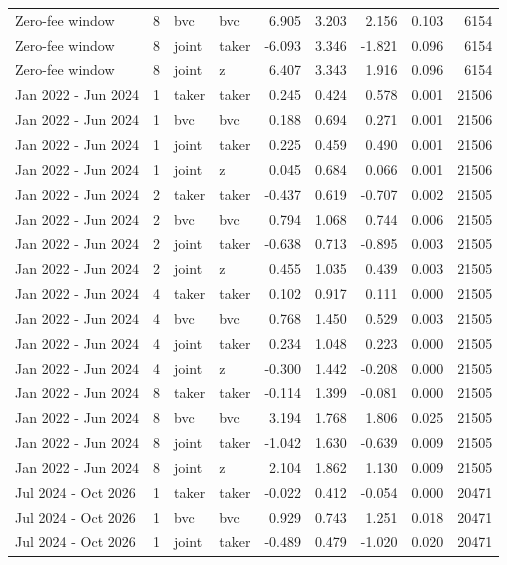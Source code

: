 \begin{tabular}{lrllrrrrr}
Zero-fee window & 8 & bvc & bvc & 6.905 & 3.203 & 2.156 & 0.103 & 6154 \\
Zero-fee window & 8 & joint & taker & -6.093 & 3.346 & -1.821 & 0.096 & 6154 \\
Zero-fee window & 8 & joint & z & 6.407 & 3.343 & 1.916 & 0.096 & 6154 \\
Jan 2022 - Jun 2024 & 1 & taker & taker & 0.245 & 0.424 & 0.578 & 0.001 & 21506 \\
Jan 2022 - Jun 2024 & 1 & bvc & bvc & 0.188 & 0.694 & 0.271 & 0.001 & 21506 \\
Jan 2022 - Jun 2024 & 1 & joint & taker & 0.225 & 0.459 & 0.490 & 0.001 & 21506 \\
Jan 2022 - Jun 2024 & 1 & joint & z & 0.045 & 0.684 & 0.066 & 0.001 & 21506 \\
Jan 2022 - Jun 2024 & 2 & taker & taker & -0.437 & 0.619 & -0.707 & 0.002 & 21505 \\
Jan 2022 - Jun 2024 & 2 & bvc & bvc & 0.794 & 1.068 & 0.744 & 0.006 & 21505 \\
Jan 2022 - Jun 2024 & 2 & joint & taker & -0.638 & 0.713 & -0.895 & 0.003 & 21505 \\
Jan 2022 - Jun 2024 & 2 & joint & z & 0.455 & 1.035 & 0.439 & 0.003 & 21505 \\
Jan 2022 - Jun 2024 & 4 & taker & taker & 0.102 & 0.917 & 0.111 & 0.000 & 21505 \\
Jan 2022 - Jun 2024 & 4 & bvc & bvc & 0.768 & 1.450 & 0.529 & 0.003 & 21505 \\
Jan 2022 - Jun 2024 & 4 & joint & taker & 0.234 & 1.048 & 0.223 & 0.000 & 21505 \\
Jan 2022 - Jun 2024 & 4 & joint & z & -0.300 & 1.442 & -0.208 & 0.000 & 21505 \\
Jan 2022 - Jun 2024 & 8 & taker & taker & -0.114 & 1.399 & -0.081 & 0.000 & 21505 \\
Jan 2022 - Jun 2024 & 8 & bvc & bvc & 3.194 & 1.768 & 1.806 & 0.025 & 21505 \\
Jan 2022 - Jun 2024 & 8 & joint & taker & -1.042 & 1.630 & -0.639 & 0.009 & 21505 \\
Jan 2022 - Jun 2024 & 8 & joint & z & 2.104 & 1.862 & 1.130 & 0.009 & 21505 \\
Jul 2024 - Oct 2026 & 1 & taker & taker & -0.022 & 0.412 & -0.054 & 0.000 & 20471 \\
Jul 2024 - Oct 2026 & 1 & bvc & bvc & 0.929 & 0.743 & 1.251 & 0.018 & 20471 \\
Jul 2024 - Oct 2026 & 1 & joint & taker & -0.489 & 0.479 & -1.020 & 0.020 & 20471 \\

\end{tabular}
